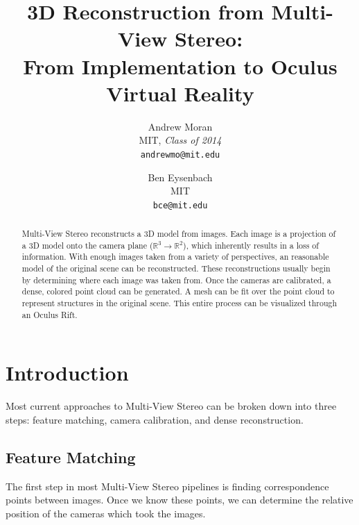 \documentclass[10pt,twocolumn,letterpaper]{article}
\begin{document}
\title{3D Reconstruction from Multi-View Stereo:\\ From Implementation to Oculus Virtual Reality}

\author{Andrew Moran\\
  MIT, \textit{Class of 2014}\\
  {\tt\small andrewmo@mit.edu}
\and
Ben Eysenbach\\
MIT\\
{\tt\small bce@mit.edu}
}

\maketitle

\begin{abstract}
   Multi-View Stereo reconstructs a 3D model from images. Each image is a projection of a 3D model onto the camera plane ($\mathbb{R}^3 \rightarrow \mathbb{R}^2$), which inherently results in a loss of information. With enough images taken from a variety of perspectives, an reasonable model of the original scene can be reconstructed. These reconstructions usually begin by determining where each image was taken from. Once the cameras are calibrated, a dense, colored point cloud can be generated. A mesh can be fit over the point cloud to represent structures in the original scene. This entire process can be visualized through an Oculus Rift.
\end{abstract}

\section{Introduction}
Most current approaches to Multi-View Stereo can be broken down into three steps: feature matching, camera calibration, and dense reconstruction.
\subsection{Feature Matching}

The first step in most Multi-View Stereo pipelines is finding correspondence points between images. Once we know these points, we can determine the relative position of the cameras which took the images. 
\end{document}
